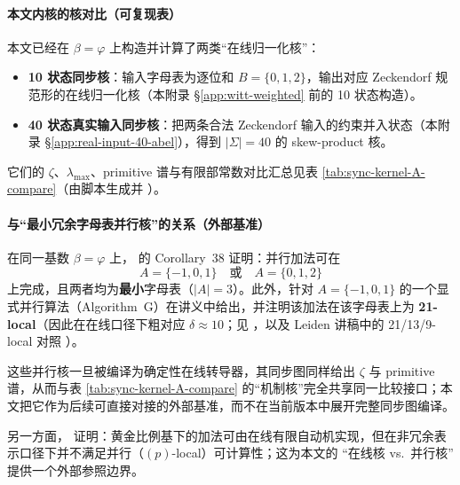 \paragraph{本文内核的核对比（可复现表）}
本文已经在 $\beta=\varphi$ 上构造并计算了两类“在线归一化核”：
\begin{itemize}
  \item \textbf{10 状态同步核}：输入字母表为逐位和 $B=\{0,1,2\}$，输出对应 Zeckendorf 规范形的在线归一化核（本附录 \S\ref{app:witt-weighted} 前的 10 状态构造）。
  \item \textbf{40 状态真实输入同步核}：把两条合法 Zeckendorf 输入的约束并入状态（本附录 \S\ref{app:real-input-40-abel}），得到 $|\Sigma|=40$ 的 skew-product 核。
\end{itemize}
它们的 $\zeta$、$\lambda_{\max}$、primitive 谱与有限部常数对比汇总见表 \ref{tab:sync-kernel-A-compare}（由脚本生成并 \verb||）。


\paragraph{与“最小冗余字母表并行核”的关系（外部基准）}
在同一基数 $\beta=\varphi$ 上，\cite{FrougnyPelantovaSvobodova2013MinimalDigitSets} 的 Corollary~38 证明：并行加法可在
\[
A=\{-1,0,1\}\quad\text{或}\quad A=\{0,1,2\}
\]
上完成，且两者均为\textbf{最小}字母表（$|A|=3$）。此外，针对 $A=\{-1,0,1\}$ 的一个显式并行算法（Algorithm~G）在讲义中给出，并注明该加法在该字母表上为 \textbf{21-local}（因此在在线口径下粗对应 $\delta\approx 10$；见 \cite{FrougnyHellerPelantovaSvobodovaParallelAlgorithmsSlides}，以及 Leiden 讲稿中的 21/13/9-local 对照 \cite{Frougny2012NumbersAsStreamsLeiden}）。

这些并行核一旦被编译为确定性在线转导器，其同步图同样给出 $\zeta$ 与 primitive 谱，从而与表 \ref{tab:sync-kernel-A-compare} 的“机制核”完全共享同一比较接口；本文把它作为后续可直接对接的外部基准，而不在当前版本中展开完整同步图编译。
\par
另一方面，\cite{Frougny1999OnlineAddition} 证明：黄金比例基下的加法可由在线有限自动机实现，但在非冗余表示口径下并不满足并行（$(p)$-local）可计算性；这为本文的 “在线核 vs.\ 并行核” 提供一个外部参照边界。

